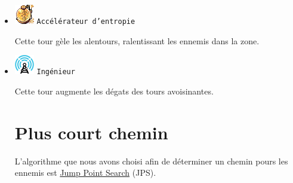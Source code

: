\documentclass{article}
\begin{document}
\begin{itemize}
\item \includegraphics{roberto.png} \texttt{Acc\'el\'erateur d'entropie}

Cette tour g\`ele les alentours, ralentissant les ennemis dans la zone.

\item \includegraphics{radar.png} \texttt{Ing\'enieur}

Cette tour augmente les d\'egats des tours avoisinantes.

\section{Plus court chemin}

L'algorithme que nous avons choisi afin de d\'eterminer un chemin pours les
ennemis est
\href{http://users.cecs.anu.edu.au/~dharabor/data/papers/harabor-grastien-aaai11.pdf}
{Jump Point Search} (JPS).

\end{itemize}
\end{document}
